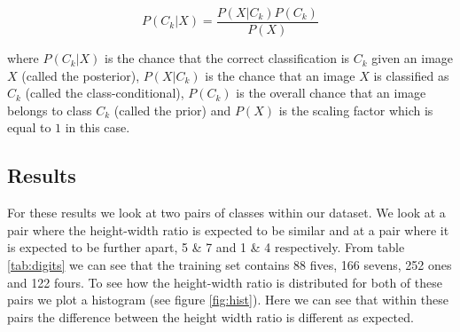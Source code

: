 \documentclass[10 pt, a4paper]{article}
\begin{document}
\begin{equation}
P(C_k | X) = \frac{P(X|C_k)P(C_k)}{P(X)}
\label{eqn:bayes}
\end{equation} 

where $P(C_k | X)$ is the chance that the correct classification is $C_k$ given an image $X$ (called the posterior), $P(X | C_k)$ is the chance that an image $X$ is classified as $C_k$ (called the class-conditional), $P(C_k)$ is the overall chance that an image belongs to class $C_k$ (called the prior) and $P(X)$ is the scaling factor which is equal to $1$ in this case.

\subsection{Results}

For these results we look at two pairs of classes within our dataset. We look at a pair where the height-width ratio is expected to be similar and at a pair where it is expected to be further apart, 5 \& 7 and 1 \& 4 respectively. From table \ref{tab:digits} we can see that the training set contains 88 fives, 166 sevens, 252 ones and 122 fours. To see how the height-width ratio is distributed for both of these pairs we plot a histogram (see figure \ref{fig:hist}). Here we can see that within these pairs the difference between the height width ratio is different as expected.
\end{document}
